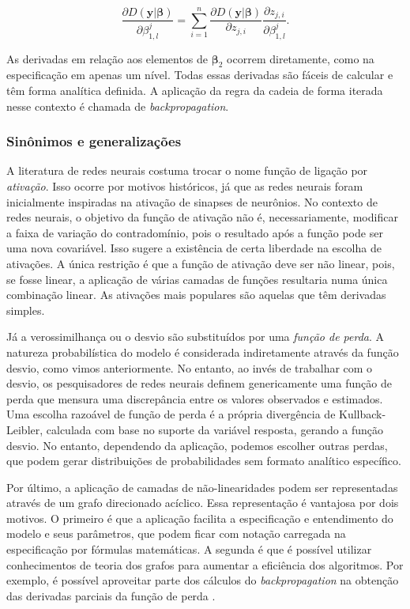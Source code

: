 \documentclass[12pt,]{report}
\begin{document}
\[
\frac{\partial D(\mathbf y|\boldsymbol\beta)}{\partial \beta_{1,l}^{j}} = \sum_{i=1}^n\frac{\partial D(\mathbf y|\boldsymbol\beta)}{\partial z_{j,i}} \frac{\partial z_{j,i}}{\partial \beta_{1,l}^{j}} .
\]

As derivadas em relação aos elementos de \(\boldsymbol \beta_2\) ocorrem diretamente, como na especificação em apenas um nível. Todas essas derivadas são fáceis de calcular e têm forma analítica definida. A aplicação da regra da cadeia de forma iterada nesse contexto é chamada de \emph{backpropagation}.

\hypertarget{sinuxf4nimos-e-generalizauxe7uxf5es}{%
\subsubsection{Sinônimos e generalizações}\label{sinuxf4nimos-e-generalizauxe7uxf5es}}

A literatura de redes neurais costuma trocar o nome função de ligação por \emph{ativação}. Isso ocorre por motivos históricos, já que as redes neurais foram inicialmente inspiradas na ativação de sinapses de neurônios. No contexto de redes neurais, o objetivo da função de ativação não é, necessariamente, modificar a faixa de variação do contradomínio, pois o resultado após a função pode ser uma nova covariável. Isso sugere a existência de certa liberdade na escolha de ativações. A única restrição é que a função de ativação deve ser não linear, pois, se fosse linear, a aplicação de várias camadas de funções resultaria numa única combinação linear. As ativações mais populares são aquelas que têm derivadas simples.

Já a verossimilhança ou o desvio são substituídos por uma \emph{função de perda}. A natureza probabilística do modelo é considerada indiretamente através da função desvio, como vimos anteriormente. No entanto, ao invés de trabalhar com o desvio, os pesquisadores de redes neurais definem genericamente uma função de perda que mensura uma discrepância entre os valores observados e estimados. Uma escolha razoável de função de perda é a própria divergência de Kullback-Leibler, calculada com base no suporte da variável resposta, gerando a função desvio. No entanto, dependendo da aplicação, podemos escolher outras perdas, que podem gerar distribuições de probabilidades sem formato analítico específico.

Por último, a aplicação de camadas de não-linearidades podem ser representadas através de um grafo direcionado acíclico. Essa representação é vantajosa por dois motivos. O primeiro é que a aplicação facilita a especificação e entendimento do modelo e seus parâmetros, que podem ficar com notação carregada na especificação por fórmulas matemáticas. A segunda é que é possível utilizar conhecimentos de teoria dos grafos para aumentar a eficiência dos algoritmos. Por exemplo, é possível aproveitar parte dos cálculos do \emph{backpropagation} na obtenção das derivadas parciais da função de perda \citep{abadi2016tensorflow}.
\end{document}
